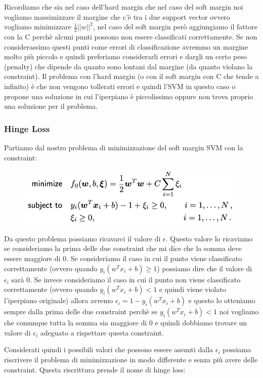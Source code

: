 \documentclass[14pt]{extreport}
\begin{document}
Ricordiamo che sia nel caso dell'hard margin che nel caso del soft margin noi vogliamo massimizzare il margine che c'è tra i due support vector ovvero
vogliamo minimizzare $\frac{1}{2}||w||^2$, nel caso del soft margin però aggiungiamo il fattore con la C perchè alcuni punti possono non essere
classificati correttamente. Se non considerassimo questi punti come errori di classificazione avremmo un margine molto più piccolo e quindi preferiamo
considerarli errori e dargli un certo peso (penalty) che dipende da quanto sono lontani dal margine (da quanto violano la constraint). Il problema con
l'hard margin (o con il soft margin con C che tende a infinito) è che non vengono tollerati errori e quindi l'SVM in questo caso o propone una
soluzione in cui l'iperpiano è piccolissimo oppure non trova proprio una soluzione per il problema.


\subsubsection{Hinge Loss}

Partiamo dal nostro problema di minimizzazione del soft margin SVM con la constraint: 

\begin{figure}[H]
\centering
\includegraphics[width=0.7\linewidth]{327.jpeg}
\end{figure}

Da questo problema possiamo ricavarci il valore di $\epsilon$. Questo valore lo ricaviamo se consideriamo la prima delle due constraint che mi dice
che la somma deve essere maggiore di 0. Se consideriamo il caso in cui il punto viene classificato correttamente (ovvero quando $y_i(w^Tx_i+b) \geq
1$) possiamo dire che il valore di $\epsilon_i$ sarà 0. Se invece consideriamo il caso in cui il punto non viene classificato correttamente (ovvero
quando $y_i(w^Tx_i+b) < 1$ e quindi viene violato l'iperpiano originale) allora avremo $\epsilon_i = 1-y_i(w^Tx_i+b)$ e questo lo otteniamo sempre
dalla prima delle due constraint perchè se $y_i(w^Tx_i+b) < 1$ noi vogliamo che comunque tutta la somma sia maggiore di 0 e quindi dobbiamo trovare un
valore di $\epsilon_i$ adeguato a rispettare questa constraint.

Considerati quindi i possibili valori che possono essere assunti dalla $\epsilon_i$ possiamo riscrivere il problema di minimizzazione in modo
differente e senza più avere delle constraint. Questa riscrittura prende il nome di hinge loss:
\end{document}
